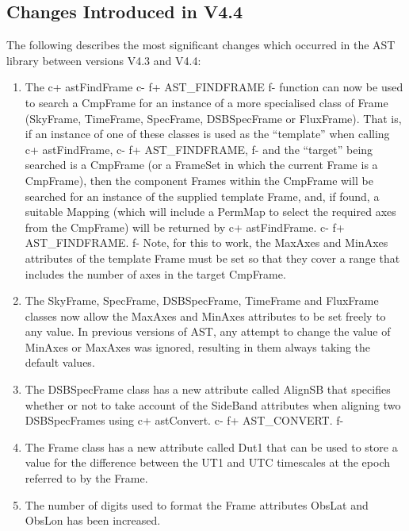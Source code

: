 \documentclass[twoside,11pt]{starlink}
\begin{document}
\subsection{Changes Introduced in V4.4}

The following describes the most significant changes which occurred in
the AST library between versions V4.3 and V4.4:

\begin{enumerate}

\item The
c+
astFindFrame
c-
f+
AST\_FINDFRAME
f-
function can now be used to search a CmpFrame for an instance of a more
specialised class of Frame (SkyFrame, TimeFrame, SpecFrame, DSBSpecFrame
or FluxFrame). That is, if an instance of one of these classes is used as
the ``template'' when calling
c+
astFindFrame,
c-
f+
AST\_FINDFRAME,
f-
and the ``target'' being searched is a CmpFrame (or a FrameSet in which the
current Frame is a CmpFrame), then the component Frames within the CmpFrame
will be searched for an instance of the supplied template Frame, and, if
found, a suitable Mapping (which will include a PermMap to select the
required axes from the CmpFrame) will be returned by
c+
astFindFrame.
c-
f+
AST\_FINDFRAME.
f-
Note, for this to work, the MaxAxes and MinAxes attributes of the template
Frame must be set so that they cover a range that includes the number of axes
in the target CmpFrame.

\item The SkyFrame, SpecFrame, DSBSpecFrame, TimeFrame and FluxFrame classes
now allow the MaxAxes and MinAxes attributes to be set freely to any value.
In previous versions of AST, any attempt to change the value of MinAxes
or MaxAxes was ignored, resulting in them always taking the default values.

\item The DSBSpecFrame class has a new attribute called AlignSB that
specifies whether or not to take account of the SideBand attributes when
aligning two DSBSpecFrames using
c+
astConvert.
c-
f+
AST\_CONVERT.
f-

\item The Frame class has a new attribute called Dut1 that can be used to
store a value for the difference between the UT1 and UTC timescales at
the epoch referred to by the Frame.

\item The number of digits used to format the Frame attributes ObsLat and
ObsLon has been increased.


\end{enumerate}
\end{document}
